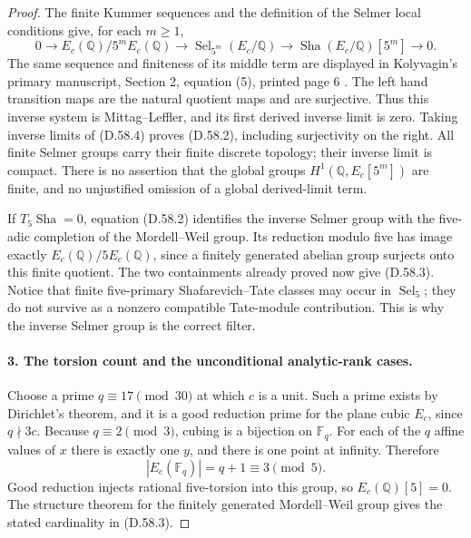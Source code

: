 \begin{proof}
The finite Kummer sequences and the definition of the Selmer
local conditions give, for each $m\ge1$,
\[
 0\longrightarrow E_c(\mathbb Q)/5^mE_c(\mathbb Q)
 \longrightarrow\operatorname{Sel}_{5^m}(E_c/\mathbb Q)
 \longrightarrow\operatorname{Sha}(E_c/\mathbb Q)[5^m]
 \longrightarrow0.                                  \tag{D.58.4}
\]
The same sequence and finiteness of its middle term are
displayed in Kolyvagin's primary manuscript, Section 2,
equation (5), printed page 6 \cite{DE_Kolyvagin1990}.
The left hand transition maps are the natural quotient
maps and are surjective.  Thus this inverse system is
Mittag--Leffler, and its first derived inverse limit is
zero.  Taking inverse limits of (D.58.4) proves (D.58.2),
including surjectivity on the right.  All finite Selmer
groups carry their finite discrete topology; their inverse
limit is compact.  There is no assertion that the global
groups $H^1(\mathbb Q,E_c[5^m])$ are finite, and no
unjustified omission of a global derived-limit term.

If $T_5\operatorname{Sha}=0$, equation (D.58.2) identifies the inverse
Selmer group with the five-adic completion of the
Mordell--Weil group.  Its reduction modulo five has image
exactly $E_c(\mathbb Q)/5E_c(\mathbb Q)$, since a finitely
generated abelian group surjects onto this finite quotient.
The two containments already proved now give (D.58.3).
Notice that finite five-primary Shafarevich--Tate classes
may occur in $\operatorname{Sel}_5$; they do not survive
as a nonzero compatible Tate-module contribution.  This
is why the inverse Selmer group is the correct filter.

\paragraph{3. The torsion count and the unconditional analytic-rank cases.}

Choose a prime $q\equiv17\pmod{30}$ at which $c$ is a unit.
Such a prime exists by Dirichlet's theorem, and it is a
good reduction prime for the plane cubic $E_c$, since
$q\nmid3c$.  Because $q\equiv2\pmod3$, cubing is a
bijection on $\mathbb F_q$.  For each of the $q$ affine
values of $x$ there is exactly one $y$, and there is one
point at infinity.  Therefore
\[
                         |E_c(\mathbb F_q)|=q+1
                                      \equiv3\pmod5.
\]
Good reduction injects rational five-torsion into this
group, so $E_c(\mathbb Q)[5]=0$.  The structure theorem
for the finitely generated Mordell--Weil group gives the
stated cardinality in (D.58.3).


\end{proof}
